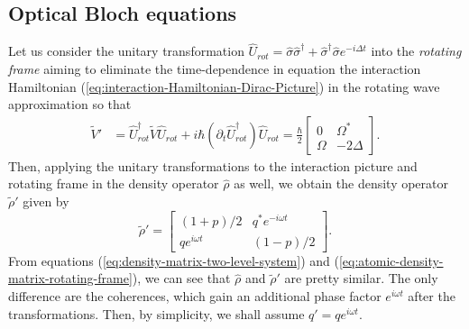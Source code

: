 \subsection{Optical Bloch equations}
\label{sec:optical-Bloch-equations}

Let us consider the unitary transformation $ \hat{U}_{rot} = \hat{\sigma}\hat{\sigma}^{\dagger} + \hat{\sigma}^{\dagger}\hat{\sigma} e^{-i \Delta t} $ into the \textit{rotating frame} aiming to eliminate the time-dependence in equation the interaction Hamiltonian (\ref{eq:interaction-Hamiltonian-Dirac-Picture}) in the rotating wave approximation so that
\begin{align}
	\tilde{V}' &= \hat{U}^{\dagger}_{rot} \tilde{V} \hat{U}_{rot} + i \hbar (\partial_t \hat{U}^{\dagger}_{rot}) \hat{U}_{rot} = \frac{\hbar}{2}\left[\begin{matrix} 0 & \Omega^* \\ \Omega & -2\Delta \end{matrix}\right].
	\label{eq:interaction-Hamiltonian-monochromatic-light}
\end{align}
Then, applying the unitary transformations to the interaction picture and rotating frame in the density operator $ \hat{\rho} $ as well, we obtain the density operator $ \tilde{\rho}' $ given by
\begin{equation}
	\tilde{\rho}' = \left[ \begin{matrix} (1 + p)/2 & q^* e^{-i\omega t} \\ q e^{i\omega t} & (1 - p)/2 \end{matrix} \right].
	\label{eq:atomic-density-matrix-rotating-frame}
\end{equation}
From equations (\ref{eq:density-matrix-two-level-system}) and (\ref{eq:atomic-density-matrix-rotating-frame}), we can see that $ \hat{\rho} $ and $ \tilde{\rho}' $ are pretty similar. The only difference are the coherences, which gain an additional phase factor $ e^{i \omega t} $ after the transformations. Then, by simplicity, we shall assume $ q' = qe^{i \omega t} $.

